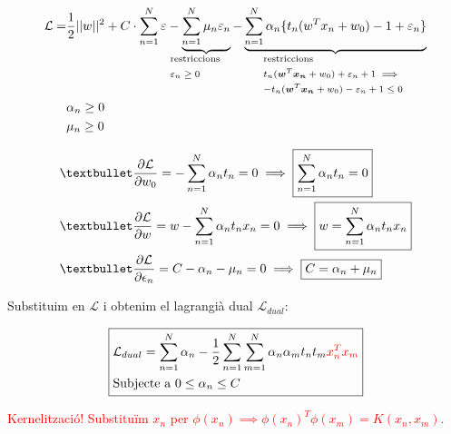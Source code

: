 \documentclass[a4paper]{article}
\newcommand*{\bmath}[1]{\boldsymbol{#1}}
\begin{document}
\begin{align*}
	\mathcal{L} =& \frac{1}{2} ||w||^2  + C \cdot \sum_{n=1}^N \varepsilon - 
	\underbrace{\sum_{n=1}^N \mu_n \varepsilon_n}_{
		\mathclap{\text{\parbox{2cm}{restriccions \\ $\varepsilon_n \ge 0$}}}} 
	-\underbrace{\sum_{n=1}^N \alpha_n \{ t_n (w^T x_n + w_0) - 1 + \varepsilon_n \}}_{\mathclap{
		\text{\parbox{4cm}{restriccions \\ 
				$t_n (\bmath{w}^T \bmath{x_n} + w_0) + \varepsilon_n + 1 \implies$ \\
				$-t_n (\bmath{w}^T \bmath{x_n} + w_0) - \varepsilon_n + 1 \le 0 $ }}
	}} 
	\\
	& \alpha_n \ge 0 \\
	& \mu_n \ge 0
\end{align*}

\begin{align*}
	& \textbullet \frac{\partial \mathcal{L}}{\partial w_0} = - \sum_{n=1}^N \alpha_n t_n = 0 \implies \boxed{\sum_{n=1}^N \alpha_n t_n = 0} \\
	& \textbullet \frac{\partial \mathcal{L}}{\partial w} = w - \sum_{n=1}^N \alpha_n t_n x_n = 0 \implies \boxed{w = \sum_{n=1}^N \alpha_n t_n x_n} \\
	& \textbullet \frac{\partial \mathcal{L}}{\partial \epsilon_n} = C - \alpha_n - \mu_n = 0  \implies \boxed{C= \alpha_n + \mu_n}
\end{align*}
	
Substituim en $\mathcal{L}$ i obtenim el lagrangià dual $\mathcal{L}_{dual}$:

$$
\boxed{
\begin{aligned}
	&\mathcal{L}_{dual} = \sum_{n=1}^N \alpha_n - 
	\frac{1}{2} \sum_{n=1}^N \sum_{m=1}^N \alpha_n \alpha_m t_n t_m \textcolor{red}{x_n^T x_m} \\
	&\text{Subjecte a } 0 \le \alpha_n \le C
\end{aligned}
}
$$

\textcolor{red}{Kernelització! Substituïm $x_n$ per $\phi (x_n) \implies \phi(x_n)^T \phi(x_m) = K(x_n, x_m)$.}
\end{document}
